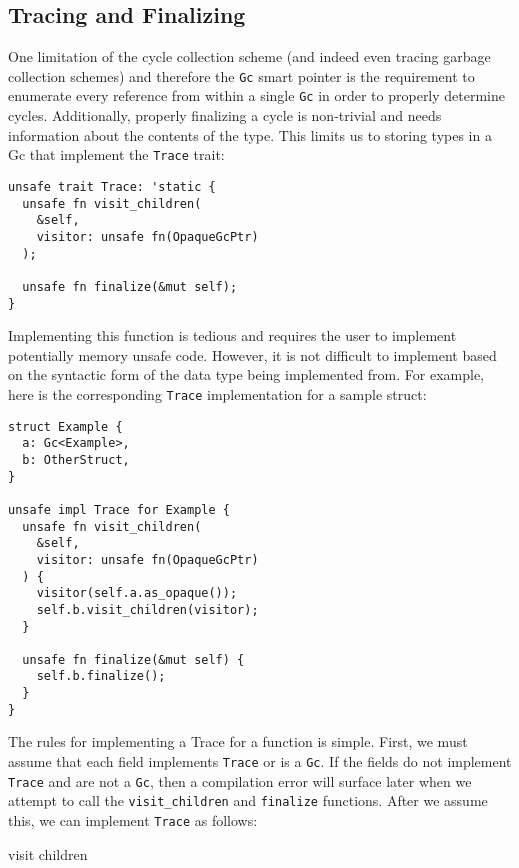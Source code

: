 \documentclass[sigplan,authordraft]{acmart}
\begin{document}
\subsection{Tracing and Finalizing}

One limitation of the cycle collection scheme (and indeed even tracing garbage
collection schemes) and therefore the \texttt{Gc} smart pointer is the
requirement to enumerate every reference from within a single \texttt{Gc} in
order to properly determine cycles. Additionally, properly finalizing a cycle is
non-trivial and needs information about the contents of the type. This limits us
to storing types in a Gc that implement the \texttt{Trace} trait:

\begin{verbatim}
unsafe trait Trace: 'static {
  unsafe fn visit_children(
    &self,
    visitor: unsafe fn(OpaqueGcPtr)
  );

  unsafe fn finalize(&mut self);
}
\end{verbatim}

Implementing this function is tedious and requires the user to implement
potentially memory unsafe code. However, it is not difficult to implement based
on the syntactic form of the data type being implemented from. For example, here
is the corresponding \texttt{Trace} implementation for a sample struct:

\begin{verbatim}
struct Example {
  a: Gc<Example>,
  b: OtherStruct,
}

unsafe impl Trace for Example {
  unsafe fn visit_children(
    &self,
    visitor: unsafe fn(OpaqueGcPtr)
  ) {
    visitor(self.a.as_opaque());
    self.b.visit_children(visitor);
  }

  unsafe fn finalize(&mut self) {
    self.b.finalize();
  }
}
\end{verbatim}

The rules for implementing a Trace for a function is simple. First, we must
assume that each field implements \texttt{Trace} or is a \texttt{Gc}. If the
fields do not implement \texttt{Trace} and are not a \texttt{Gc}, then a
compilation error will surface later when we attempt to call the
\texttt{visit\_children} and \texttt{finalize} functions. After we assume this,
we can implement \texttt{Trace} as follows:

\begin{algorithm}
  \caption{visit children}\label{alg:cap}

\end{algorithm}
\end{document}
